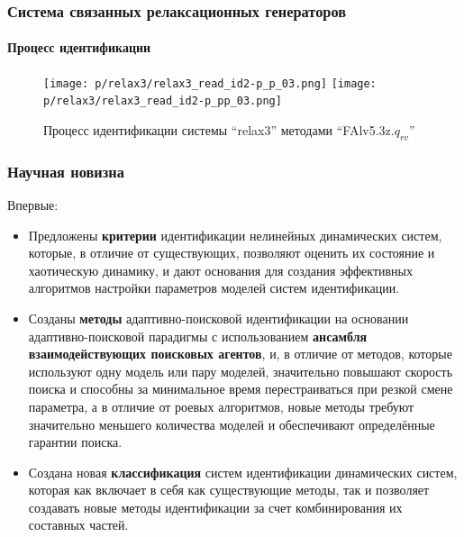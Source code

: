 \documentclass[10pt,utf8]{beamer}
\begin{document}

\begin{frame}
  \frametitle{Система связанных релаксационных генераторов}
  \framesubtitle{Процесс идентификации}

  \begin{figure}[ht!]
    \centerline{
      \texttt{[image: p/relax3/relax3\_read\_id2-p\_p\_03.png]}
      \texttt{[image: p/relax3/relax3\_read\_id2-p\_pp\_03.png]}
      \hfill
    }
    \caption{Процесс идентификации системы ``relax3'' методами ``FAlv5.3z.$q_{rv}$'' }
    \label{atu:f:relax3_id0}
  \end{figure}

\end{frame}




\begin{frame}
  \frametitle{Научная новизна}

  \noindent
  Впервые:

  \begin{itemize}

    \item
      Предложены \textbf{критерии} идентификации нелинейных динамических систем, которые, в
      отличие от существующих, позволяют оценить их состояние и хаотическую динамику,
      и дают основания для создания эффективных алгоритмов настройки параметров
      моделей систем идентификации.

    \item
      Созданы \textbf{методы} адаптивно-поисковой идентификации на основании
      адаптивно-поисковой парадигмы с использованием \textbf{ансамбля взаимодействующих поисковых агентов},
      и, в отличие от методов, которые
      используют одну модель или пару моделей, значительно повышают скорость поиска и
      способны за минимальное время перестраиваться при резкой смене параметра, а в
      отличие от роевых алгоритмов, новые методы требуют значительно меньшего
      количества моделей и обеспечивают определённые гарантии поиска.

    \item
      Создана новая \textbf{классификация} систем идентификации динамических систем, которая
      как включает в себя как существующие методы, так и позволяет создавать новые методы
      идентификации за счет комбинирования их составных частей.

  \end{itemize}


\end{frame}
\end{document}
